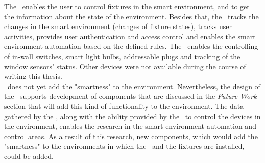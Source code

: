 The \seif\ enables the user to control fixtures in the smart environment, and to get the information about the state of the environment. Besides that, the \seif\ tracks the changes in the smart environment (changes of fixture states), tracks user activities, provides user authentication and access control and enables the smart environment automation based on the defined rules. The \seif\ enables the controlling of in-wall switches, smart light bulbs, addressable plugs and tracking of the window sensors' status. Other devices were not available during the course of writing this thesis.\\

\seif\ does not yet add the "smartness" to the environment. Nevertheless, the design of the \seif\ supports development of components that are discussed in the \textit{Future Work} section that will add this kind of functionality to the environment. The data gathered by the \seif, along with the ability provided by the \seif\ to control the devices in the environment, enables the research in the smart environment automation and control areas. As a result of this research, new components, which would add the "smartness" to the environments in which the \seif\ and the fixtures are installed, could be added.



